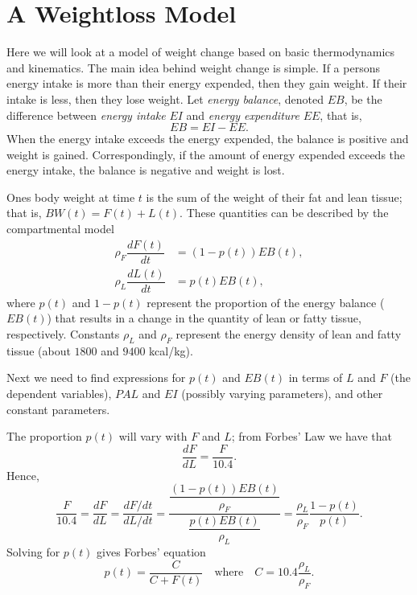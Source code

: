 \section*{A Weightloss Model}
Here we will look at a model of weight change based on basic thermodynamics and kinematics.
The main idea behind weight change is simple.  If a persons energy intake is more than their energy expended, then they gain weight.  If their intake is less, then they lose weight.
Let \emph{energy balance}, denoted $EB$, be the difference between \emph{energy intake} $EI$ and \emph{energy expenditure} $EE$, that is,
\begin{equation}
\label{EB}
EB = EI - EE.
\end{equation}
When the energy intake exceeds the energy expended, the balance is positive and weight is gained.  Correspondingly, if the amount of energy expended exceeds the energy intake, the balance is negative and weight is lost.


Ones body weight at time $t$ is the sum of the weight of their fat and lean tissue; that is,  $BW(t) = F(t) + L(t).$ These quantities can be described by the compartmental model
\begin{subequations}
\label{compartment}
\begin{align}
\rho_F \dfrac{dF(t)}{dt} &= (1-p(t)) EB(t),\label{compartment:a}\\
\rho_L \dfrac{dL(t)}{dt} &= p(t) EB(t),\label{compartment:b}
\end{align}
\end{subequations}
where $p(t)$ and $1-p(t)$ represent the proportion of the energy balance ($EB(t)$) that results in a change in the quantity of lean or fatty tissue, respectively. Constants $\rho_L$ and $\rho_F$ represent the energy density of lean and fatty tissue (about $1800$ and $9400$ kcal/kg).

Next we need to find expressions for $p(t)$ and $EB(t)$ in terms of $L$ and $F$ (the dependent variables), $PAL$ and $EI$ (possibly varying parameters), and other constant parameters.

 The proportion $p(t)$ will vary with $F$ and $L$; from Forbes' Law \cite{Fo.2} we have that
\begin{equation}
\label{Forbes}
\dfrac{dF}{dL} = \dfrac{F}{10.4}.
\end{equation}
Hence,
\[
\dfrac{F}{10.4} = \dfrac{dF}{dL} = \dfrac{dF/dt}{dL/dt} = \dfrac{\dfrac{(1-p(t)) EB(t)}{\rho_F}}{\dfrac{p(t) EB(t)}{\rho_L}} = \dfrac{\rho_L}{\rho_F} \dfrac{1-p(t)}{p(t)}.
\]
Solving for $p(t)$ gives Forbes' equation
\begin{equation}
\label{Forbes2}
p(t) = \dfrac{C}{C+F(t)}\quad\mbox{where}\quad C=10.4\dfrac{\rho_L}{\rho_F}.
\end{equation}


